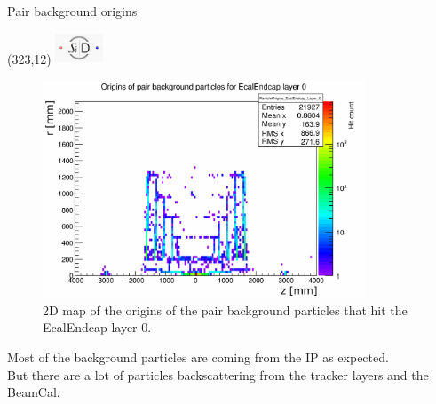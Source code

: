\documentclass[xcolor={dvipsnames}]{beamer}
\newcommand{\sidlogo}{
  \setlength{\TPHorizModule}{1pt}
  \setlength{\TPVertModule}{1pt}
  \begin{textblock}{1}(323,12)
   \includegraphics[width=40pt,height=26pt]{figures/SiD.jpeg}
  \end{textblock}
  }
\begin{document}
\begin{frame}{Pair background origins}
\sidlogo
  \begin{figure}
 	\begin{columns}
        \begin{flushright}
        \includegraphics[width=0.9\textwidth]{figures/sidloi3_pairs_1312_EcalEndcap_Hits_EcalEndcap_ParticleOrigins_EcalEndcap_Layer_0.pdf}
        \end{flushright}
        \begin{flushleft}
	\caption{\small 2D map of the origins of the pair background particles that hit the EcalEndcap layer 0.}
        \end{flushleft}
      \end{columns}
\end{figure}

Most of the background particles are coming from the IP as expected.\\
But there are a lot of particles backscattering from the tracker layers and the BeamCal.
\end{frame}
\end{document}
